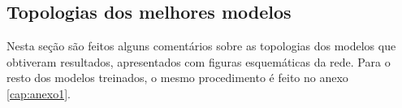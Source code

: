         \begin{figure}[H]
        \end{figure}
        
    \subsection{Topologias dos melhores modelos}
    
    Nesta seção são feitos alguns comentários sobre as topologias dos modelos que obtiveram resultados, apresentados com figuras esquemáticas da rede. Para o resto dos modelos treinados, o mesmo procedimento é feito no anexo \ref{cap:anexo1}.
         
